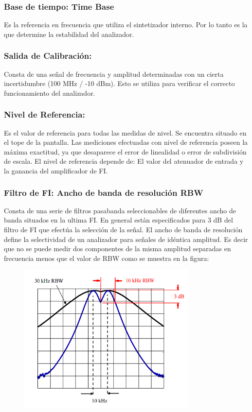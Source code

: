 \documentclass[a4paper,12pt,twoside]{article}
\begin{document}
\subsubsection{Base de tiempo: Time Base}
Es la referencia en frecuencia que utiliza el sintetizador interno. Por lo tanto es la que determine
la estabilidad del analizador.

\subsubsection{ Salida de Calibración:}
Consta de una señal de frecuencia y amplitud determinadas con un cierta incertidumbre
(100 MHz / -10 dBm). Esto se utiliza para verificar el correcto funcionamiento del analizador. 

\subsubsection{Nivel de Referencia:}
Es el valor de referencia para todas las medidas de nivel. Se encuentra situado en el tope de la
pantalla. Las mediciones efectuadas con nivel de referencia poseen la máxima exactitud, ya que
desaparece el error de linealidad o error de subdivisión de escala.
El nivel de referencia depende de:
El valor del atenuador de entrada y la ganancia del amplificador de FI.

\subsubsection{Filtro de FI: Ancho de banda de resolución RBW}
Consta de una serie de filtros pasabanda seleccionables de diferentes ancho de banda
situados en la ultima FI.
En general están especificados para 3 dB del filtro de FI que efectúa la selección de la
señal. El ancho de banda de resolución define la selectividad de un analizador para señales
de idéntica amplitud. Es decir que no se puede medir dos componentes de la misma
amplitud separadas en frecuencia menos que el valor de RBW como se muestra en la
figura:

\begin{figure}[H]
    \centering
    \includegraphics[width=0.8\textwidth]{../img/analizador_espectro2.png}
\end{figure}
\end{document}
